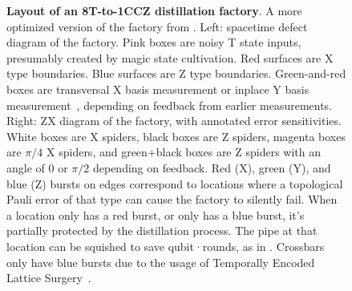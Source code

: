 \documentclass[onecolumn,unpublished,a4paper]{quantumarticle}
\theoremstyle{definition}
\begin{document}
\begin{figure}
    \begin{adjustwidth}{-2.5cm}{-2.5cm}
        \centering
    \end{adjustwidth}
    \caption{
        \textbf{Layout of an 8T-to-1CCZ distillation factory}.
        A more optimized version of the factory from \cite{gidney2019catalyzeddistillation}.
        Left: spacetime defect diagram of the factory.
        Pink boxes are noisy T state inputs, presumably created by magic state cultivation.
        Red surfaces are X type boundaries.
        Blue surfaces are Z type boundaries.
        Green-and-red boxes are transversal X basis measurement or inplace Y basis measurement~\cite{gidney2024ybasis}, depending on feedback from earlier measurements.
        Right: ZX diagram of the factory, with annotated error sensitivities.
        White boxes are X spiders, black boxes are Z spiders, magenta boxes are $\pi/4$ X spiders, and green+black boxes are Z spiders with an angle of 0 or $\pi/2$ depending on feedback.
        Red (X), green (Y), and blue (Z) bursts on edges correspond to locations where a topological Pauli error of that type can cause the factory to silently fail.
        When a location only has a red burst, or only has a blue burst, it's partially protected by the distillation process.
        The pipe at that location can be squished to save qubit·rounds, as in \cite{litinski2019notascostly}.
        Crossbars only have blue bursts due to the usage of Temporally Encoded Lattice Surgery~\cite{chamberland2022tels}.
    }
    \label{fig:ccz-factory}
\end{figure}
\end{document}
